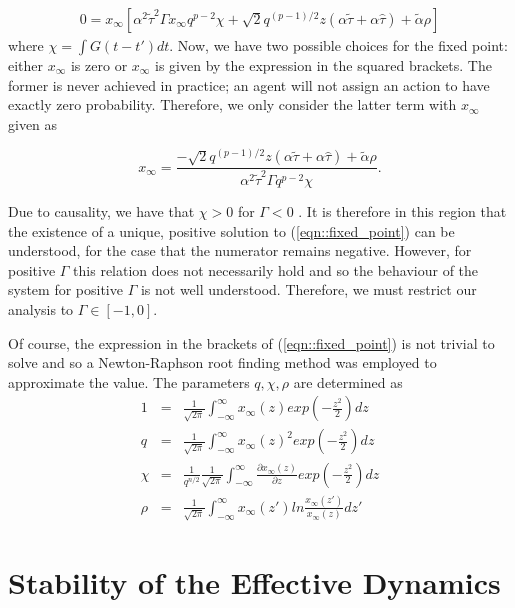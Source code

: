 \documentclass{article}
\newcommand{\talpha}{\tilde{\alpha}}
\newcommand{\ttau}{\tilde{\tau}}
\newcommand{\htau}{\hat{\tau}}
\newcommand{\xfixed}{x_\infty}
\begin{document}
\begin{eqnarray}
    0 = \xfixed [ \alpha^2 \ttau^2 \Gamma \xfixed q^{p-2} \chi 
       + \sqrt{2} q^{(p-1)/2}z (\alpha \ttau  + \alpha \htau) + \talpha \rho]
    \label{eqn::fixed_point}
\end{eqnarray}
%
where $\chi = \int G(t-t') dt $. Now, we have two possible choices for the fixed point: either $\xfixed$ is zero or $\xfixed$ is given by the expression in the squared brackets. The former is never achieved in practice; an agent will not assign an action to have exactly zero probability. Therefore, we only consider the latter term with $\xfixed$ given as

\begin{equation}
    \xfixed = \frac{- \sqrt{2} q^{(p-1)/2}z (\alpha \ttau  + \alpha \htau) + \talpha \rho}{\alpha^2 \ttau^2 \Gamma  q^{p-2} \chi}.
\end{equation}

Due to causality, we have that $\chi > 0$ for $\Gamma < 0$ \cite{Opper1992, Galla2013}. It is therefore in this region that the existence of a unique, positive solution to (\ref{eqn::fixed_point}) can be understood, for the case that the numerator remains negative. However, for positive $\Gamma$ this relation does not necessarily hold and so the behaviour of the system for positive $\Gamma$ is not well understood. Therefore, we must restrict our analysis to $\Gamma \in [-1, 0]$.

Of course, the expression in the brackets of (\ref{eqn::fixed_point}) is not trivial to solve and so a Newton-Raphson root finding method was employed to approximate the value. The parameters $q, \chi, \rho$ are determined as
%
\begin{eqnarray*}
        1 & = & \frac{1}{\sqrt{2 \pi}} \int_{-\infty}^{\infty} \xfixed(z) exp(-\frac{z^2}{2}) dz \\ 
        q & = & \frac{1}{\sqrt{2 \pi}} \int_{-\infty}^{\infty} \xfixed(z)^2 exp(-\frac{z^2}{2}) dz \\ 
        \chi & = & \frac{1}{q^{n/2}}\frac{1}{\sqrt{2 \pi}} \int_{-\infty}^{\infty} \frac{\partial \xfixed (z)}{\partial z} exp(-\frac{z^2}{2}) dz\\
        \rho & = & \frac{1}{\sqrt{2 \pi}} \int_{-\infty}^{\infty} \xfixed(z') ln \frac{\xfixed(z')}{\xfixed(z)} dz'
\end{eqnarray*}

\section{Stability of the Effective Dynamics}
\end{document}
